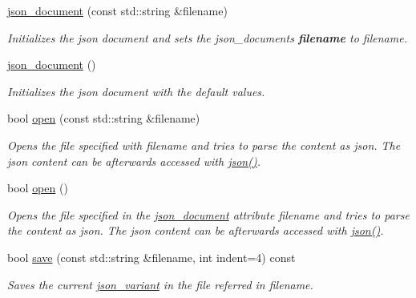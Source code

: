 \begin{DoxyCompactItemize}
\hyperlink{classJSONLIB__NAMESPACE_1_1json__document_a3295c12f7251f1df5dc5f727a4e5b597}{json\+\_\+document} (const std\+::string \&filename)
\begin{DoxyCompactList}\small\item\em Initializes the json document and sets the json\+\_\+documents {\bfseries filename} to {\ttfamily filename}. \end{DoxyCompactList}\item 
\hyperlink{classJSONLIB__NAMESPACE_1_1json__document_acf256862749f93052ab0a5ad54272c3e}{json\+\_\+document} ()
\begin{DoxyCompactList}\small\item\em Initializes the json document with the default values. \end{DoxyCompactList}\item 
bool \hyperlink{classJSONLIB__NAMESPACE_1_1json__document_a20dc761125ccf91f7747f28a7c356be7}{open} (const std\+::string \&filename)
\begin{DoxyCompactList}\small\item\em Opens the file specified with {\ttfamily filename} and tries to parse the content as json. The json content can be afterwards accessed with \hyperlink{classJSONLIB__NAMESPACE_1_1json__document_ad87b8e7d68ba854dbd730758273a3b93}{json()}. \end{DoxyCompactList}\item 
bool \hyperlink{classJSONLIB__NAMESPACE_1_1json__document_a08e509059e628742f35716dddce2d740}{open} ()
\begin{DoxyCompactList}\small\item\em Opens the file specified in the \hyperlink{classJSONLIB__NAMESPACE_1_1json__document}{json\+\_\+document} attribute {\ttfamily filename} and tries to parse the content as json. The json content can be afterwards accessed with \hyperlink{classJSONLIB__NAMESPACE_1_1json__document_ad87b8e7d68ba854dbd730758273a3b93}{json()}. \end{DoxyCompactList}\item 
bool \hyperlink{classJSONLIB__NAMESPACE_1_1json__document_ab2e8c0baffe0ef93f3d3dc78b342453b}{save} (const std\+::string \&filename, int indent=4) const
\begin{DoxyCompactList}\small\item\em Saves the current \hyperlink{classJSONLIB__NAMESPACE_1_1json__variant}{json\+\_\+variant} in the file referred in {\ttfamily filename}. \end{DoxyCompactList}\item 

\end{DoxyCompactItemize}
